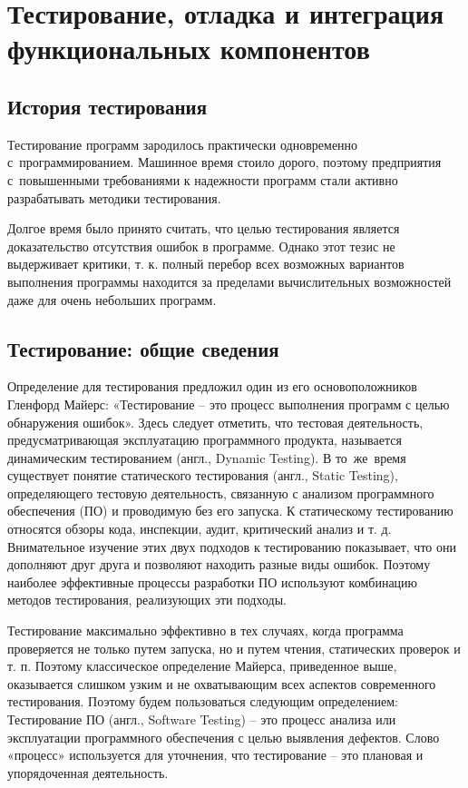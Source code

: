 \documentclass{ou}
\begin{document}
\section{Тестирование, отладка и интеграция функциональных компонентов}
\subsection{История тестирования}
Тестирование программ зародилось практически одновременно с~программированием. Машинное время стоило дорого, поэтому предприятия с~повышенными требованиями к надежности программ стали активно разрабатывать методики тестирования.

Долгое время было принято считать, что целью тестирования является доказательство отсутствия ошибок в программе. Однако этот тезис не выдерживает критики, т. к. полный перебор всех возможных вариантов выполнения программы находится за пределами вычислительных возможностей даже для очень небольших программ. 
\subsection{Тестирование: общие сведения}
Определение для тестирования предложил один из его основоположников Гленфорд Майерс: «Тестирование -- это процесс выполнения программ с целью обнаружения ошибок». Здесь следует отметить, что тестовая деятельность, предусматривающая эксплуатацию программного продукта, называется динамическим тестированием (англ., Dynamic Testing). В то~же~время существует понятие статического тестирования (англ., Static Testing), определяющего тестовую деятельность, связанную с анализом программного обеспечения (ПО) и проводимую без его запуска. К статическому тестированию относятся обзоры кода, инспекции, аудит, критический анализ и т. д. Внимательное изучение этих двух подходов к тестированию показывает, что они дополняют друг друга и позволяют находить разные виды ошибок. Поэтому наиболее эффективные процессы разработки ПО используют комбинацию методов тестирования, реализующих эти подходы. 

Тестирование максимально эффективно в тех случаях, когда программа проверяется не только путем запуска, но и путем чтения, статических проверок и т. п. Поэтому классическое определение Майерса, приведенное выше, оказывается слишком узким и не охватывающим всех аспектов современного тестирования. Поэтому будем пользоваться следующим определением: Тестирование ПО (англ., Software Testing) -- это процесс анализа или эксплуатации программного обеспечения с целью выявления дефектов. Слово «процесс» используется для уточнения, что тестирование -- это плановая и упорядоченная деятельность. 
\end{document}

